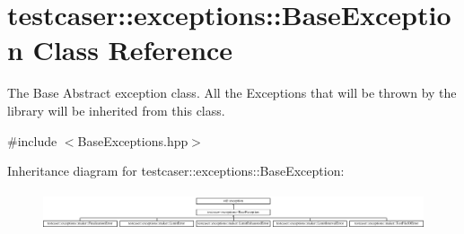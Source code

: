 \hypertarget{classtestcaser_1_1exceptions_1_1BaseException}{}\section{testcaser\+::exceptions\+::Base\+Exception Class Reference}
\label{classtestcaser_1_1exceptions_1_1BaseException}


The Base Abstract exception class. All the Exceptions that will be thrown by the library will be inherited from this class.  




{\ttfamily \#include $<$Base\+Exceptions.\+hpp$>$}

Inheritance diagram for testcaser\+::exceptions\+::Base\+Exception\+:\begin{figure}[H]
\begin{center}
\leavevmode
\includegraphics[height=1.135135cm]{classtestcaser_1_1exceptions_1_1BaseException}
\end{center}
\end{figure}
